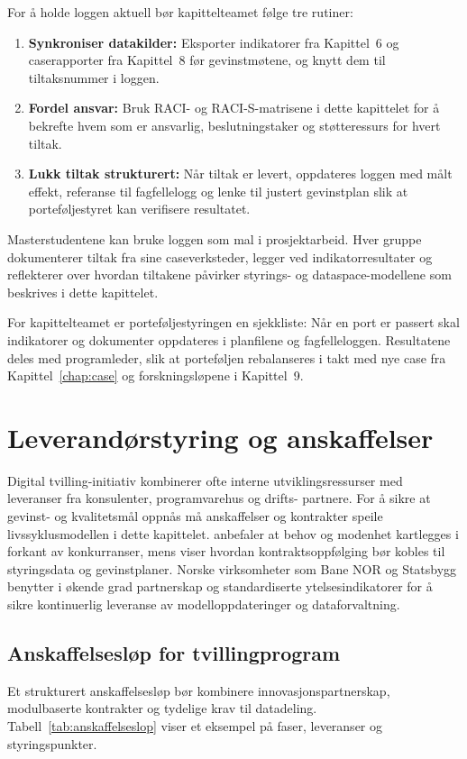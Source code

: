 For å holde loggen aktuell bør kapittelteamet følge tre rutiner:
\begin{enumerate}
    \item \textbf{Synkroniser datakilder:} Eksporter indikatorer fra Kapittel~6 og caserapporter fra Kapittel~8 før gevinstmøtene, og knytt dem til tiltaksnummer i loggen.
    \item \textbf{Fordel ansvar:} Bruk RACI- og RACI-S-matrisene i dette kapittelet for å bekrefte hvem som er ansvarlig, beslutningstaker og støtteressurs for hvert tiltak.
    \item \textbf{Lukk tiltak strukturert:} Når tiltak er levert, oppdateres loggen med målt effekt, referanse til fagfellelogg og lenke til justert gevinstplan slik at porteføljestyret kan verifisere resultatet.
\end{enumerate}

Masterstudentene kan bruke loggen som mal i prosjektarbeid. Hver gruppe dokumenterer tiltak fra sine caseverksteder, legger ved indikatorresultater og reflekterer over hvordan tiltakene påvirker styrings- og dataspace-modellene som beskrives i dette kapittelet.

For kapittelteamet er porteføljestyringen en sjekkliste: Når en port er passert skal indikatorer og dokumenter oppdateres i planfilene og fagfelleloggen. Resultatene deles med programleder, slik at porteføljen rebalanseres i takt med nye case fra Kapittel~\ref{chap:case} og forskningsløpene i Kapittel~9.

\section{Leverandørstyring og anskaffelser}
Digital tvilling-initiativ kombinerer ofte interne utviklingsressurser med leveranser fra konsulenter, programvarehus og drifts-
partnere. For å sikre at gevinst- og kvalitetsmål oppnås må anskaffelser og kontrakter speile livssyklusmodellen i dette kapittelet.
\citet{dfo2023anskaffelser} anbefaler at behov og modenhet kartlegges i forkant av konkurranser, mens \citet{dfo2024kontraktsoppfolging}
viser hvordan kontraktsoppfølging bør kobles til styringsdata og gevinstplaner. Norske virksomheter som Bane NOR og Statsbygg
benytter i økende grad partnerskap og standardiserte ytelsesindikatorer for å sikre kontinuerlig leveranse av modelloppdateringer
og dataforvaltning.\citep{statsbygg2023digitalmodenhet,banenor2024leverandor}

\subsection*{Anskaffelsesløp for tvillingprogram}
Et strukturert anskaffelsesløp bør kombinere innovasjonspartnerskap, modulbaserte kontrakter og tydelige krav til datadeling.
Tabell~\ref{tab:anskaffelseslop} viser et eksempel på faser, leveranser og styringspunkter.

